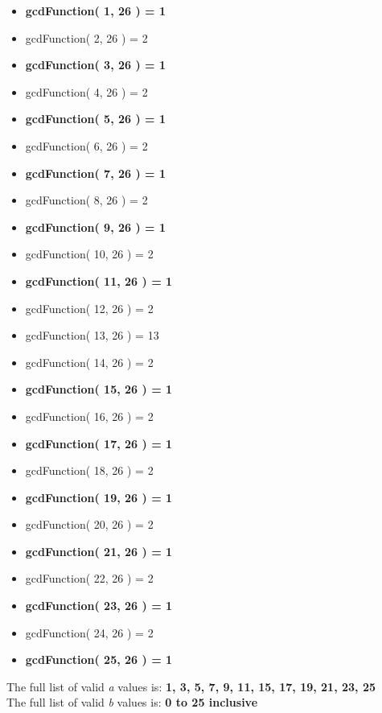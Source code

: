 \documentclass[]{article}
\begin{document}
\begin{multicols}{2}
	\begin{itemize}
		\item \textbf{gcdFunction( 1, 26 ) = 1}
		\item gcdFunction( 2, 26 ) = 2
		\item \textbf{gcdFunction( 3, 26 ) = 1}
		\item gcdFunction( 4, 26 ) = 2
		\item \textbf{gcdFunction( 5, 26 ) = 1}
		\item gcdFunction( 6, 26 ) = 2
		\item \textbf{gcdFunction( 7, 26 ) = 1}
		\item gcdFunction( 8, 26 ) = 2
	    \item \textbf{gcdFunction( 9, 26 ) = 1}
		\item gcdFunction( 10, 26 ) = 2
		\item \textbf{gcdFunction( 11, 26 ) = 1}
		\item gcdFunction( 12, 26 ) = 2
		\item gcdFunction( 13, 26 ) = 13
		\item gcdFunction( 14, 26 ) = 2
		\item \textbf{gcdFunction( 15, 26 ) = 1}
		\item gcdFunction( 16, 26 ) = 2
		\item \textbf{gcdFunction( 17, 26 ) = 1}
		\item gcdFunction( 18, 26 ) = 2
		\item \textbf{gcdFunction( 19, 26 ) = 1}
		\item gcdFunction( 20, 26 ) = 2
		\item \textbf{gcdFunction( 21, 26 ) = 1}
		\item gcdFunction( 22, 26 ) = 2	
		\item \textbf{gcdFunction( 23, 26 ) = 1}
		\item gcdFunction( 24, 26 ) = 2
		\item \textbf{gcdFunction( 25, 26 ) = 1}
	\end{itemize}
\end{multicols}


\vspace{0.5cm}
\noindent
The full list of valid \textit{a} values is: \textbf{1, 3, 5, 7, 9, 11, 15, 17, 19, 21, 23, 25}\\

\noindent
The full list of valid \textit{b} values is: \textbf{0 to 25 inclusive}\\
\end{document}
